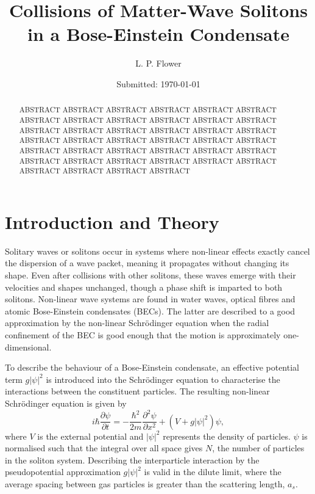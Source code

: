 \documentclass[10pt, twocolumn]{revtex4}    %
\begin{document}
                     


\title{Collisions of Matter-Wave Solitons in a Bose-Einstein Condensate} 
\date{Submitted: \today{}}
\author{L. P. Flower}

\begin{abstract}              
 
ABSTRACT ABSTRACT ABSTRACT ABSTRACT ABSTRACT ABSTRACT ABSTRACT ABSTRACT ABSTRACT ABSTRACT ABSTRACT ABSTRACT ABSTRACT ABSTRACT ABSTRACT ABSTRACT ABSTRACT ABSTRACT ABSTRACT ABSTRACT ABSTRACT ABSTRACT ABSTRACT ABSTRACT ABSTRACT ABSTRACT ABSTRACT ABSTRACT ABSTRACT ABSTRACT ABSTRACT ABSTRACT ABSTRACT ABSTRACT ABSTRACT ABSTRACT ABSTRACT ABSTRACT ABSTRACT ABSTRACT 

\end{abstract}

\maketitle
\thispagestyle{plain} %



\section{Introduction and Theory} \label{Intro}

Solitary waves or solitons occur in systems where non-linear effects exactly cancel the dispersion of a wave packet, meaning it propagates without changing its shape. Even after collisions with other solitons, these waves emerge with their velocities and shapes unchanged, though a phase shift is imparted to both solitons. Non-linear wave systems are found in water waves, optical fibres and atomic Bose-Einstein condensates (BECs). The latter are described to a good approximation by the non-linear Schr\"{o}dinger equation when the radial confinement of the BEC is good enough that the motion is approximately one-dimensional. 

To describe the behaviour of a Bose-Einstein condensate, an effective potential term $g |\psi|^2$  is introduced into the Schr\"{o}dinger equation to characterise the interactions between the constituent particles. The resulting non-linear Schr\"{o}dinger equation is given by 
\begin{equation} \label{NLSE}
i \hbar \frac{\partial \psi}{\partial t} = -\frac{\hbar^2}{2m} \frac{\partial^2 \psi}{\partial x^2} + (V+g |\psi|^2) \psi,
\end{equation}
where $V$ is the external potential and $|\psi|^2$ represents the density of particles. $\psi$ is normalised such that the integral over all space gives $N$, the number of particles in the soliton system. Describing the interparticle interaction by the pseudopotential approximation $g |\psi|^2$ is valid in the dilute limit, where the average spacing between gas particles is greater than the scattering length, $a_s$. 
\end{document}

